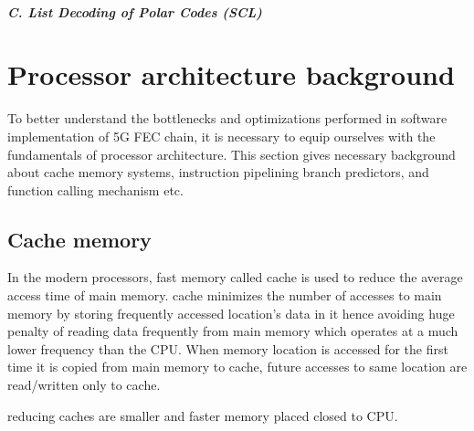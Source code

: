 \paragraph{\emph{C. List Decoding of Polar Codes (SCL)}\newline}  \label{SCL}


\section{Processor architecture background}
To better understand the bottlenecks and optimizations performed in software implementation of 5G FEC chain, it is necessary to equip ourselves with the fundamentals of processor architecture. This section gives necessary background about cache memory systems, instruction pipelining branch predictors, and function calling mechanism etc.

\subsection{Cache memory}
In the modern processors, fast memory called cache is used to reduce the average access time of main memory. cache minimizes the number of accesses to main memory by storing frequently accessed location's data in it hence avoiding huge penalty of reading data frequently from main memory which operates at a much lower frequency than the CPU. When memory location is accessed for the first time it is copied from main memory to cache, future accesses to same location are read/written only to cache.


reducing caches are smaller and faster memory placed closed to CPU.



